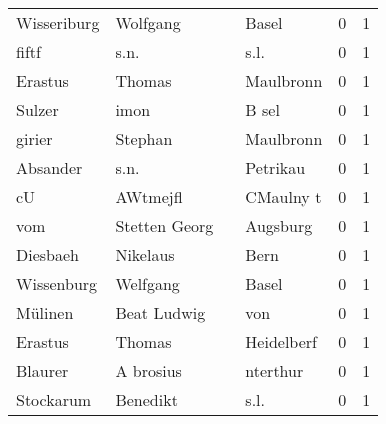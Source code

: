\documentclass[10pt,a4paper,landscape]{article}
\begin{document}
\begin{longtable}{llllrr}
              Wisseriburg &                           Wolfgang &             &                                       Basel &          0 &         1 \\
                    fiftf &                               s.n. &             &                                        s.l. &          0 &         1 \\
                  Erastus &                             Thomas &             &                                   Maulbronn &          0 &         1 \\
                   Sulzer &                               imon &             &                                       B sel &          0 &         1 \\
                   girier &                            Stephan &             &                                   Maulbronn &          0 &         1 \\
                 Absander &                               s.n. &             &                                    Petrikau &          0 &         1 \\
                       cU &                           AWtmejfl &             &                                   CMaulny t &          0 &         1 \\
                      vom &                      Stetten Georg &             &                                    Augsburg &          0 &         1 \\
                 Diesbaeh &                           Nikelaus &             &                                        Bern &          0 &         1 \\
               Wissenburg &                           Welfgang &             &                                       Basel &          0 &         1 \\
                  Mülinen &                        Beat Ludwig &             &                                         von &          0 &         1 \\
                  Erastus &                             Thomas &             &                                  Heidelberf &          0 &         1 \\
                  Blaurer &                          A brosius &             &                                    nterthur &          0 &         1 \\
                Stockarum &                           Benedikt &             &                                        s.l. &          0 &         1 \\

\end{longtable}
\end{document}
